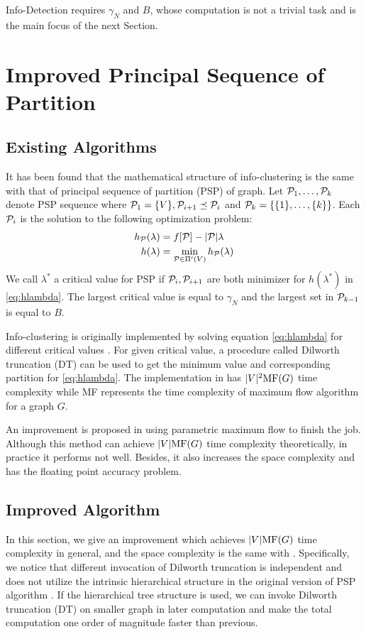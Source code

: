 \documentclass[runningheads]{llncs}
\begin{document}
Info-Detection requires $\gamma_N$ and $B$, whose computation is not a trivial task and is the main focus of the next Section.

\section{Improved Principal Sequence of Partition}\label{sec:Alg}
\subsection{Existing Algorithms}
It has been found that the mathematical structure of info-clustering is the same with that of principal sequence of partition (PSP) of graph. Let $\P_1, \dots, \P_k$ denote PSP sequence where $\P_1 = \{V\}, \P_{i+1} \preceq \P_i$ and $\P_k = \{\{1\},\dots,\{k\}\}$.
Each $\P_i$ is the solution to the following optimization problem:
\begin{align}
h_{\P}(\lambda) &=  f[\P] - \abs{\P} \lambda  \label{eq:hPL}\\
h(\lambda) &= \min_{\P \in \Pi'(V)} h_{\P}(\lambda) \label{eq:hlambda}
\end{align}
We call $\lambda^*$ a critical value for PSP if $\P_i, \P_{i+1}$ are both minimizer for $h(\lambda^*)$ in \eqref{eq:hlambda}.
The largest critical value is equal to $\gamma_N$ and the largest set in $\P_{k-1}$ is equal to $B$. 

Info-clustering is originally implemented by solving equation \eqref{eq:hlambda} for different critical values \cite{RN3}. For given critical value, a procedure called Dilworth truncation (DT) can be used to get the minimum value and corresponding partition for \eqref{eq:hlambda}. The implementation in \cite{RN3} has $\abs{V}^2 \textrm{MF}(G)$ time complexity while \textrm{MF} represents the time complexity of maximum flow algorithm for a graph $G$. 

An improvement is proposed in \cite{RN4} using parametric maximum flow to finish the job. Although this method can achieve $\abs{V} \textrm{MF}(G)$ time complexity theoretically, in practice it performs not well. Besides, it also increases the space complexity and has the floating point accuracy problem. 

\subsection{Improved Algorithm} 
In this section, we give an improvement which achieves $\abs{V} \textrm{MF}(G)$ time complexity in general, and the space complexity is the same with \cite{RN4}. Specifically,
we notice that different invocation of Dilworth truncation is independent and does not utilize the intrinsic hierarchical structure in the original version of PSP algorithm \cite{RN3}. If the hierarchical tree structure is used, we can invoke Dilworth truncation (DT) on smaller graph in later computation and make the total computation one order of magnitude faster than previous.
\end{document}
